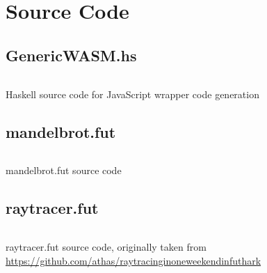 \documentclass[11pt]{book}
\newcommand\blankpage{%
    \null
    \thispagestyle{empty}%
    \addtocounter{page}{-1}%
    \newpage}
\newenvironment{longlisting}{\captionsetup{type=listing}}{}
\begin{document}
\appendix
\chapter{Source Code}

\section{GenericWASM.hs}
\begin{longlisting}
\inputminted[fontsize=\small,baselinestretch=0.5,linenos,breaklines]{Haskell}{code/compiler/codegen/GenericWASM.hs}
        \caption{Haskell source code for JavaScript wrapper code generation}    
        \label{lst:generic_wasm}    
\end{longlisting}  

\section{mandelbrot.fut}
\begin{longlisting}
\inputminted[fontsize=\small,baselinestretch=0.5,linenos,breaklines]{ocaml}{code/examples/futhark/mandelbrot.fut}
        \caption{mandelbrot.fut source code}    
        \label{lst:mandelbrot-src}    
\end{longlisting}  

\section{raytracer.fut}
\begin{longlisting}
\inputminted[fontsize=\small,baselinestretch=0.5,linenos,breaklines]{ocaml}{code/examples/futhark/raytracer.fut}
        \caption{raytracer.fut source code, originally taken from \url{https://github.com/athas/raytracinginoneweekendinfuthark}}    
        \label{lst:raytracing-src}    
\end{longlisting}  



\printbibliography[heading=bibintoc]

\afterpage{\blankpage}
\end{document}
